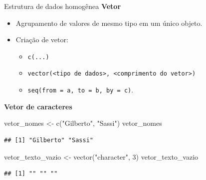 \documentclass[
  10pt,
  ignorenonframetext,
]{beamer}
\newenvironment{Shaded}{}{}
\newcommand{\DecValTok}[1]{#1}
\newcommand{\KeywordTok}[1]{\textcolor[rgb]{0.00,0.00,1.00}{#1}}
\newcommand{\NormalTok}[1]{#1}
\newcommand{\StringTok}[1]{\textcolor[rgb]{0.00,0.50,0.50}{#1}}
\providecommand{\tightlist}{%
  \setlength{\itemsep}{0pt}\setlength{\parskip}{0pt}}
\begin{document}
\begin{frame}[fragile]{Estrutura de dados homogênea}
\protect\hypertarget{estrutura-de-dados-homoguxeanea}{}
\textbf{Vetor}

\begin{itemize}
\tightlist
\item
  Agrupamento de valores de mesmo tipo em um único objeto.
\item
  Criação de vetor:

  \begin{itemize}
  \tightlist
  \item
    \texttt{c(...)}
  \item
    \texttt{vector(\textquotesingle{}\textless{}tipo\ de\ dados\textgreater{}\textquotesingle{},\ \textless{}comprimento\ do\ vetor\textgreater{})}
  \item
    \texttt{seq(from\ =\ a,\ to\ =\ b,\ by\ =\ c)}.
  \end{itemize}
\end{itemize}

\textbf{Vetor de caracteres}

\begin{Shaded}
\begin{Highlighting}[]
\NormalTok{vetor\_nomes  \textless{}{-}}\StringTok{ }\KeywordTok{c}\NormalTok{(}\StringTok{"Gilberto"}\NormalTok{, }\StringTok{"Sassi"}\NormalTok{)}
\NormalTok{vetor\_nomes}
\end{Highlighting}
\end{Shaded}

\begin{verbatim}
## [1] "Gilberto" "Sassi"
\end{verbatim}

\begin{Shaded}
\begin{Highlighting}[]
\NormalTok{vetor\_texto\_vazio \textless{}{-}}\StringTok{ }\KeywordTok{vector}\NormalTok{(}\StringTok{"character"}\NormalTok{, }\DecValTok{3}\NormalTok{)}
\NormalTok{vetor\_texto\_vazio}
\end{Highlighting}
\end{Shaded}

\begin{verbatim}
## [1] "" "" ""
\end{verbatim}
\end{frame}
\end{document}
